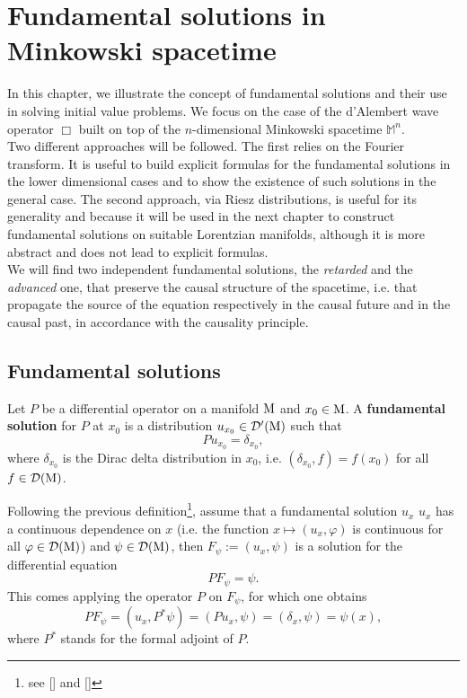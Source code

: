 \chapter{Fundamental solutions in Minkowski spacetime}
\label{chapter2}

In this chapter, we illustrate the concept of fundamental solutions and their use in solving initial value problems. We focus on the case of the d'Alembert wave operator $\Box$ built on top of the $n$-dimensional Minkowski spacetime $\mathbb{M}^n$.\\
Two different approaches will be followed. The first relies on the Fourier transform. It is useful to build explicit formulas for the fundamental solutions in the lower dimensional cases and to show the existence of such solutions in the general case.
The second approach, via Riesz distributions, is useful for its generality and because it will be used in the next chapter to construct fundamental solutions on suitable Lorentzian manifolds, although it is more abstract and does not lead to explicit formulas.\\
We will find two independent fundamental solutions, the \emph{retarded} and the \emph{advanced} one, that preserve the causal structure of the spacetime, i.e. that propagate the source of the equation respectively in the causal future and in the causal past, in accordance with the causality principle.\\


\section{Fundamental solutions}
\begin{definition}
	Let $P$ be a differential operator on a manifold $\mathrm{M}$ and $x_0\in\mathrm{M}$. A \textbf{fundamental solution} for $P$ at $x_0$ is a distribution $u_{x_0}\in\mathcal{D}'(\mathrm{M})$ such that
	\[Pu_{x_0}=\delta_{x_0},\]
	where $\delta_{x_0}$ is the Dirac delta distribution in $x_0$, i.e. $(\delta_{x_0},f)=f(x_0)$ for all $f\in\mathcal{D}(\mathrm{M})$.
\end{definition}

\noindent Following the previous definition\footnote{see [\citealp[Ch. 2]{bar2}] and [\citealp{ginoux}]}, assume that a fundamental solution $u_x$ $u_x$ has a continuous dependence on $x$ (i.e. the function $x\mapsto(u_x,\varphi)$ is continuous for all $\varphi\in\mathcal{D}(\mathrm{M})$) and $\psi\in\mathcal{D}(\mathrm{M})$, then $F_\psi:=(u_x,\psi)$ is a solution for the differential equation
	\[	PF_\psi=\psi.		\]
	This comes applying the operator $P$ on $F_\psi$, for which one obtains
	\[	PF_\psi=(u_x,P^*\psi)=(Pu_x,\psi)=(\delta_{x},\psi)=\psi(x),		\]where $P^*$ stands for the formal adjoint of $P$.


